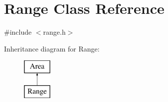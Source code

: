 \hypertarget{class_range}{}\section{Range Class Reference}
\label{class_range}


{\ttfamily \#include $<$range.\+h$>$}

Inheritance diagram for Range\+:\begin{figure}[H]
\begin{center}
\leavevmode
\includegraphics[height=2.000000cm]{class_range}
\end{center}
\end{figure}
